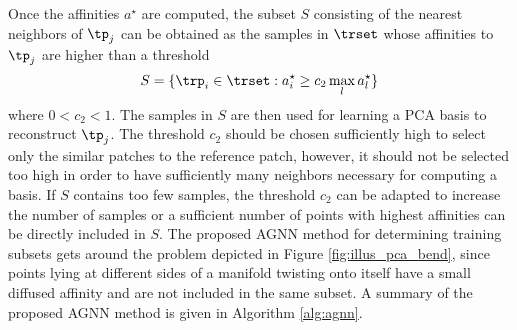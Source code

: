 \documentclass[journal]{IEEEtran}
\begin{document}
Once the affinities $a^{\star}$ are computed, the subset $S$ consisting of the nearest neighbors of $\tp_j$ can be obtained as the samples in $\trset$ whose affinities to $\tp_j$ are higher than a threshold
%
\begin{equation}
\label{eq:agnn_aff_thres}
S=\{ \trp_i \in \trset : a^{\star}_i \geq  c_2  \max_l a^{\star}_l \}
\end{equation}
%
where $0<c_2< 1$. The samples in $S$ are then used for learning a PCA basis to reconstruct $\tp_j$. The threshold $c_2$ should be chosen sufficiently high to select only the similar patches to the reference patch, however, it should not be selected too high in order to have sufficiently many neighbors necessary for computing a basis. If $S$ contains too few samples, the threshold $c_2$ can be adapted to increase the number of samples or a sufficient number of points with highest affinities can be directly included in $S$. The proposed AGNN method for determining training subsets gets around the problem depicted in Figure \ref{fig:illus_pca_bend}, since points lying at different sides of a manifold twisting onto itself have a small diffused affinity and are not included in the same subset. A summary of the proposed AGNN method is given in Algorithm \ref{alg:agnn}. 







\end{document}
